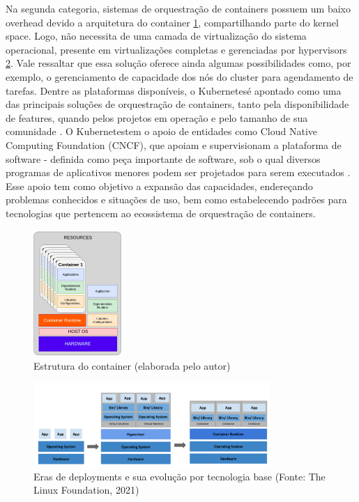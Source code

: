 Na segunda categoria, sistemas de orquestração de containers possuem um baixo overhead devido a arquitetura do container \ref{fig:container}, compartilhando parte do kernel space. Logo, não necessita de uma camada de virtualização do sistema operacional, presente em virtualizações completas e gerenciadas por hypervisors \ref{fig:vmscontainer}. Vale ressaltar que essa solução oferece ainda algumas possibilidades como, por exemplo,  o gerenciamento de capacidade dos nós do cluster para agendamento de tarefas. Dentre as plataformas disponíveis, o Kubernetes\textregistered é apontado como uma das principais soluções de orquestração de containers, tanto pela disponibilidade de features, quando pelos projetos em operação e pelo tamanho de sua comunidade \cite{truyen_comprehensive_2021}. O Kubernetes\textregistered tem o apoio de entidades como Cloud Native Computing Foundation (CNCF), que apoiam e supervisionam a plataforma de software -  definida como peça importante de software, sob o qual diversos programas de aplicativos menores podem ser projetados para serem executados \cite{collins2022}. Esse apoio tem como objetivo a expansão  das capacidades, endereçando problemas conhecidos e situações de uso, bem como estabelecendo padrões para tecnologias que pertencem ao ecossistema de orquestração de containers.

\begin{figure}[!h]
    \centering
    \includegraphics[width=0.3\textwidth]{04-figuras/containers.png}
    \caption{Estrutura do container (elaborada pelo autor)}
    \label{fig:container}
\end{figure}

\begin{figure}[!h]
    \centering
    \includegraphics[width=0.8\textwidth]{04-figuras/vmsContainer.png}
    \caption{Eras de deployments e sua evolução por tecnologia base (Fonte: The Linux Foundation\textregistered, 2021)}
    \label{fig:vmscontainer}
\end{figure}

